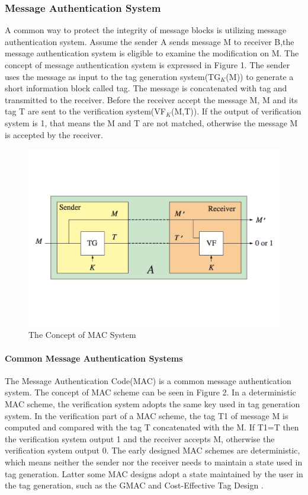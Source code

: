 \documentclass{article}
\begin{document}
\subsubsection{Message Authentication System}
A common way to protect the integrity of message blocks is utilizing message authentication system. Assume the sender A sends message M to receiver B,the message authentication system is eligible to examine the modification on M. The concept of message authentication system is expressed in Figure 1. The sender uses the message as input to the tag generation system(TG$_K$(M)) to generate a short information block called tag. The message is concatenated with tag and transmitted to the receiver. Before the receiver accept the message M, M and its tag T are sent to the verification system(VF$_K$(M,T)). If the output of verification system is 1, that means the M and T are not matched, otherwise the message M is accepted by the receiver. 
\begin{figure}[htbp]
\centering
\includegraphics[scale=0.4]{./diagrams/ma.pdf}
\caption{The Concept of MAC System}
\label{fig:1 }
\end{figure}
\paragraph{Common Message Authentication Systems}
The Message Authentication Code(MAC) is a common message authentication system. The concept of MAC scheme can be seen in Figure 2. In a deterministic MAC scheme, the verification system adopts the same key used in tag generation system. In the verification part of a MAC scheme, the tag T1 of message M is computed and compared with the tag T concatenated with the M. If T1=T then the verification system output 1 and the receiver accepts M, otherwise the verification system output 0. 
The early designed MAC schemes are deterministic, which means neither the sender nor the receiver needs to maintain a state used in tag generation. Latter some MAC designs adopt a state maintained by the user in the tag generation, such as the GMAC \cite{gcm} and Cost-Effective Tag Design \cite{cetd}.  
\end{document}
